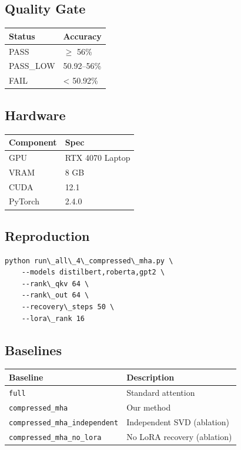 \subsection{Quality Gate}

\begin{table}[H]
\centering
\small
\begin{tabular}{ll}
\toprule
\textbf{Status} & \textbf{Accuracy} \\
\midrule
PASS & $\ge$ 56\% \\
PASS\_LOW & 50.92--56\% \\
FAIL & \textless{} 50.92\% \\
\bottomrule
\end{tabular}
\end{table}

\subsection{Hardware}

\begin{table}[H]
\centering
\small
\begin{tabular}{ll}
\toprule
\textbf{Component} & \textbf{Spec} \\
\midrule
GPU & RTX 4070 Laptop \\
VRAM & 8 GB \\
CUDA & 12.1 \\
PyTorch & 2.4.0 \\
\bottomrule
\end{tabular}
\end{table}

\subsection{Reproduction}

\begin{lstlisting}
python run\_all\_4\_compressed\_mha.py \
    --models distilbert,roberta,gpt2 \
    --rank\_qkv 64 \
    --rank\_out 64 \
    --recovery\_steps 50 \
    --lora\_rank 16
\end{lstlisting}

\subsection{Baselines}

\begin{table}[H]
\centering
\small
\begin{tabular}{ll}
\toprule
\textbf{Baseline} & \textbf{Description} \\
\midrule
\texttt{full} & Standard attention \\
\texttt{compressed\_mha} & Our method \\
\texttt{compressed\_mha\_independent} & Independent SVD (ablation) \\
\texttt{compressed\_mha\_no\_lora} & No LoRA recovery (ablation) \\
\bottomrule
\end{tabular}
\end{table}

